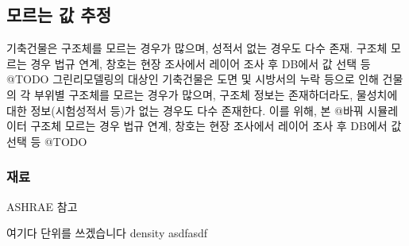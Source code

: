 \subsection{모르는 값 추정}
기축건물은 구조체를 모르는 경우가 많으며, 성적서 없는 경우도 다수 존재.
구조체 모르는 경우 법규 연계, 창호는 현장 조사에서 레이어 조사 후 DB에서 값 선택 등 @TODO
그린리모델링의 대상인 기축건물은 도면 및 시방서의 누락 등으로 인해 건물의 각 부위별 구조체를 모르는 경우가 많으며, 구조체 정보는 존재하더라도, 물성치에 대한 정보(시험성적서 등)가 없는 경우도 다수 존재한다. 이를 위해, 본 @바꿔 시뮬레이터 구조체 모르는 경우 법규 연계, 창호는 현장 조사에서 레이어 조사 후 DB에서 값 선택 등 @TODO


\subsubsection{재료}
ASHRAE 참고

여기다 단위를 쓰겠습니다 \unit{density} \unit{asdfasdf}

